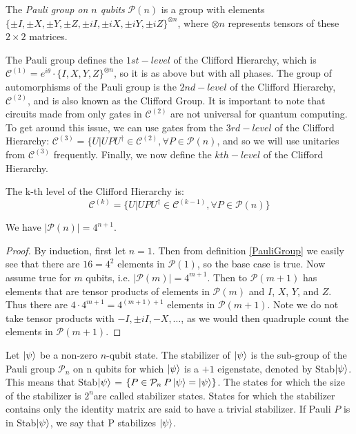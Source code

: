 \documentclass[12pt]{dalthesis}
\begin{document}
\begin{definition}
\label{PauliGroup}
  The \emph{Pauli group on $n$ qubits} $\mathcal{P}(n)$ is a group with elements $\{ \pm I, \pm X, \pm Y, \pm Z, \pm iI, \pm iX, \pm iY, \pm iZ \}^{\otimes n}$, where $\otimes n$ represents tensors of these $ 2 \times 2$ matrices.
\end{definition}

The Pauli group defines the $1st-level$ of the Clifford Hierarchy, which is $\mathcal{C}^{(1)} = e^{i\theta} \cdot \{I, X, Y, Z\}^{\otimes n}$, so it is as above but with all phases. The group of automorphisms of the Pauli group is the $2nd-level$ of the Clifford Hierarchy, $\mathcal{C}^{(2)}$, and is also known as the Clifford Group. It is important to note that circuits made from only gates in $\mathcal{C}^{(2)}$ are not universal for quantum computing. To get around this issue, we can use gates from the $3rd-level$ of the Clifford Hierarchy: $\mathcal{C}^{(3)} = \{ U | UPU^{\dag} \in \mathcal{C}^{(2)}, \forall P \in \mathcal{P}(n)$, and so we will use unitaries from $\mathcal{C}^{(3)}$ frequently. Finally, we now define the $kth-level$ of the Clifford Hierarchy. 

\begin{definition} The k-th level of the Clifford Hierarchy is:
\label{CliffHierarchy}
\begin{equation}
\mathcal{C}^{(k)} = \{ U | UPU^{\dag} \in \mathcal{C}^{(k-1)}, \forall P \in \mathcal{P}(n) \}
\end{equation}
\end{definition}


\begin{proposition}
  We have $|\mathcal{P}(n)|=4^{n+1}$.
\end{proposition}

\begin{proof}
By induction, first let $n=1$. Then from definition \ref{PauliGroup} we easily see that there are $16 = 4^2$ elements in $\mathcal{P}(1)$, so the base case is true. Now assume true for $m$ qubits, i.e. $|\mathcal{P}(m)| = 4^{m+1}$. Then to $\mathcal{P}(m+1)$ has elements that are tensor products of elements in $\mathcal{P}(m)$ and $I$, $X$, $Y$, and $Z$. Thus there are $4 \cdot 4^{m+1} = 4^{(m+1)+1}$ elements in $\mathcal{P}(m+1)$. Note we do not take tensor products with $-I, \pm iI, -X, \ldots$, as we would then quadruple count the elements in $\mathcal{P}(m+1)$.
\end{proof}

\begin{definition}[Stabilizer]
Let $\ket{\psi}$ be a non-zero $n$-qubit state. The stabilizer of $\ket{\psi}$ is the sub-group of the Pauli group $\mathcal{P}_n$ on n qubits for which $\ket{\psi}$ is a $+1$ eigenstate, denoted by Stab$\ket{\psi}$. This means that Stab$\ket{\psi}$ = $\{P \in \mathcal{P}_n \: P \ket{\psi} = \ket{\psi} \}$. The states for which the size of the stabilizer is $2^n$are called stabilizer states. States for which the stabilizer contains only the identity matrix are said to have a trivial stabilizer. If Pauli $P$ is in Stab$\ket{\psi}$, we say that P stabilizes $\ket{\psi}$.
\end{definition}
\end{document}
